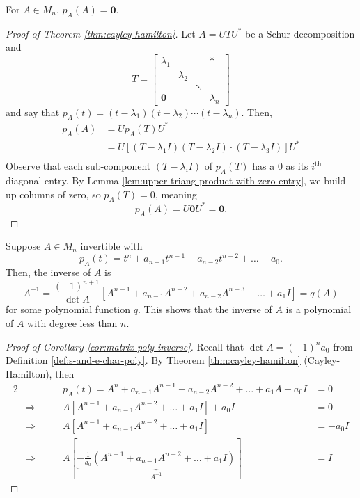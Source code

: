 \begin{theorem}
\label{thm:cayley-hamilton}
For $A \in M_n$, $p_A(A) = \mathbf{0}$.
\end{theorem}

\begin{proof}[Proof of Theorem \ref{thm:cayley-hamilton}]
Let $A = UTU^*$ be a Schur decomposition and
$$
T = \begin{bmatrix}
\lambda_1 & & & * \\
& \lambda_2 & & \\
& & \ddots & \\
\mathbf{0} & & & \lambda_n
\end{bmatrix}
$$
and say that $p_A(t) = (t-\lambda_1)(t-
\lambda_2) \cdots (t-\lambda_n)$. Then,
\begin{align*}
    p_A(A) &= Up_A(T)U^* \\
           &= U[(T-\lambda_1I)(T-\lambda_2I)\cdot(T-\lambda_3I)]U^* \\
\end{align*}
Observe that each sub-component $(T-\lambda_i I)$ of $p_A(T)$ has a 0 as its $i^{\text{th}}$ diagonal entry. By Lemma \ref{lem:upper-triang-product-with-zero-entry}, we build up columns of zero, so $p_A(T) = 0$, meaning
$$
p_A(A) = U\mathbf{0}U^* = \mathbf{0}.
$$
\end{proof}

\begin{corollary}
\label{cor:matrix-poly-inverse}
Suppose $A \in M_n$ invertible with
$$
p_A(t) = t^n + a_{n-1}t^{n-1} + a_{n-2}t^{n-2} + \dots + a_0.
$$
Then, the inverse of $A$ is
$$
A^{-1} = \frac{(-1)^{n+1}}{\det A}[A^{n-1} + a_{n-1}A^{n-2} + a_{n-2}A^{n-3} + \dots + a_1 I] = q(A)
$$
for some polynomial function $q$. This shows that the inverse of $A$ is a polynomial of $A$ with degree less than $n$.
\end{corollary}

\begin{proof}[Proof of Corollary \ref{cor:matrix-poly-inverse}]
Recall that $\det A = (-1)^n a_0$ from Definition \ref{def:s-and-e-char-poly}. By Theorem \ref{thm:cayley-hamilton} (Cayley-Hamilton), then 
\begin{alignat*}{2}
    && p_A(t) = A^n + a_{n-1}A^{n-1} + a_{n-2}A^{n-2} + \dots + a_1A + a_0I &= 0 \\
    &\Longrightarrow \quad \quad & A[A^{n-1} + a_{n-1}A^{n-2} + \dots + a_1 I] + a_0 I &= 0 \\
    &\Longrightarrow \quad \quad & A[A^{n-1} + a_{n-1}A^{n-2} + \dots + a_1 I] &= -a_0 I \\
    &\Longrightarrow \quad \quad & A[\underbrace{-\frac{1}{a_0} \left(A^{n-1} + a_{n-1}A^{n-2} + \dots + a_1 I\right)}_{A^{-1}}] &= I
\end{alignat*}
\end{proof}

